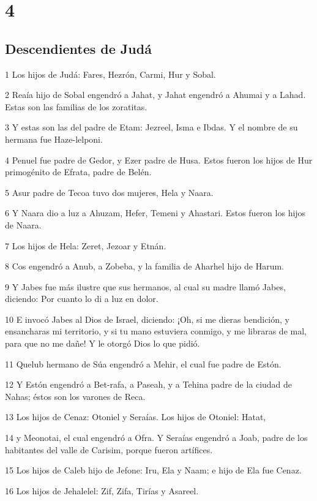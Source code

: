 \chapter{4}

\section*{Descendientes de Judá}

\par 1 Los hijos de Judá: Fares, Hezrón, Carmi, Hur y Sobal.
\par 2 Reaía hijo de Sobal engendró a Jahat, y Jahat engendró a Ahumai y a Lahad. Estas son las familias de los zoratitas.
\par 3 Y estas son las del padre de Etam: Jezreel, Isma e Ibdas. Y el nombre de su hermana fue Haze-lelponi.
\par 4 Penuel fue padre de Gedor, y Ezer padre de Husa. Estos fueron los hijos de Hur primogénito de Efrata, padre de Belén.
\par 5 Asur padre de Tecoa tuvo dos mujeres, Hela y Naara.
\par 6 Y Naara dio a luz a Ahuzam, Hefer, Temeni y Ahastari. Estos fueron los hijos de Naara.
\par 7 Los hijos de Hela: Zeret, Jezoar y Etnán.
\par 8 Cos engendró a Anub, a Zobeba, y la familia de Aharhel hijo de Harum.
\par 9 Y Jabes fue más ilustre que sus hermanos, al cual su madre llamó Jabes, diciendo: Por cuanto lo di a luz en dolor.
\par 10 E invocó Jabes al Dios de Israel, diciendo: ¡Oh, si me dieras bendición, y ensancharas mi territorio, y si tu mano estuviera conmigo, y me libraras de mal, para que no me dañe! Y le otorgó Dios lo que pidió.
\par 11 Quelub hermano de Súa engendró a Mehir, el cual fue padre de Estón.
\par 12 Y Estón engendró a Bet-rafa, a Paseah, y a Tehina padre de la ciudad de Nahas; éstos son los varones de Reca.
\par 13 Los hijos de Cenaz: Otoniel y Seraías. Los hijos de Otoniel: Hatat,
\par 14 y Meonotai, el cual engendró a Ofra. Y Seraías engendró a Joab, padre de los habitantes del valle de Carisim, porque fueron artífices.
\par 15 Los hijos de Caleb hijo de Jefone: Iru, Ela y Naam; e hijo de Ela fue Cenaz.
\par 16 Los hijos de Jehalelel: Zif, Zifa, Tirías y Asareel.
